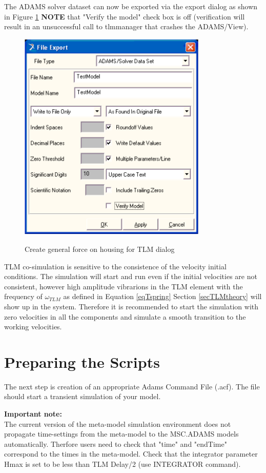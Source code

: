 The ADAMS solver dataset can now be exported via the export
dialog as shown in Figure \ref{figADMExport}
\textbf{NOTE} that "Verify the model" check box is off (verification
will result in an unsuccessful call to tlmmanager that crashes the ADAMS/View).

\begin{figure}[h]
\begin{center}
   {\includegraphics[width=9cm]{figs/TLMExportADM.png}}
\end{center}
\caption{Create general force on housing for TLM dialog \label{figADMExport}}
\end{figure}

TLM co-simulation is sensitive to the consistence of
the velocity initial conditions. The
simulation will start and run even if the initial
velocities are not consistent, however high amplitude
vibrarions in the TLM element with the frequency of
$\omega_{TLM}$ as defined in Equation \ref{eqTspring}
Section \ref{secTLMtheory} will show up in the system.
Therefore it is recommended to
start the simulation with zero velocities in all the
components and simulate a smooth transition to the
working velocities.
\clearpage

\section{Preparing the Scripts}
\label{adams:startup-script}
The next step is creation of an appropriate Adams Command File (.acf).
The file should start a transient simulation of your model.

{\bf Important note:}\\ The current version of the meta-model
simulation environment does not propagate time-settings from the
meta-model to the MSC.ADAMS models automatically. Therfore users need
to check that "time" and "endTime" correspond to the times in the
meta-model.  Check that the integrator parameter Hmax is set to be
less than TLM Delay/2 (use INTEGRATOR command).

